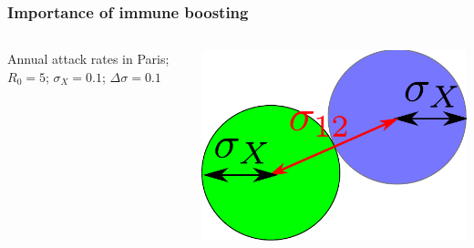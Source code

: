 \documentclass{beamer}
\begin{document}
%  
%
%
%

\begin{frame}
  \frametitle{Importance of immune boosting}

  \begin{columns}
    \begin{column}{0.9 \linewidth}
      \begin{center}
        \begin{footnotesize}
          Annual attack rates in Paris; $R_0=5$; $\sigma_X=0.1$; $\Delta \sigma = 0.1$
        \end{footnotesize}
      \end{center}
    \end{column}
    \begin{column}{0.1 \linewidth}
      \begin{flushleft}
        \includegraphics[width=1\linewidth]{graph/dessin4.pdf}
      \end{flushleft}
    \end{column}
  \end{columns}
  

\end{frame}
\end{document}
